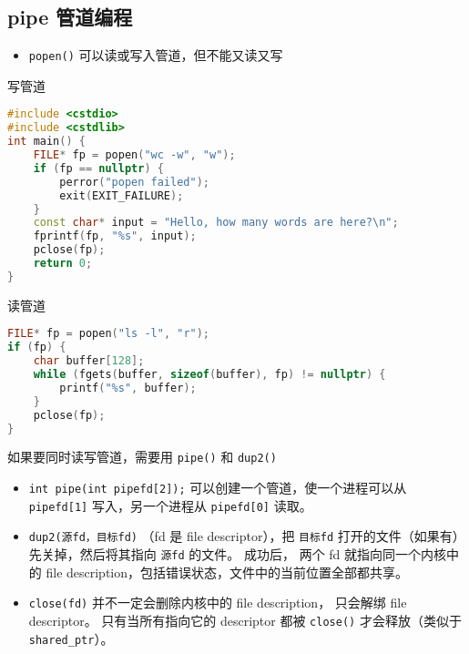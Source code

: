 \subsection{pipe 管道编程}
\begin{itemize}
\item \verb`popen()` 可以读或写入管道，但不能又读又写
\end{itemize}

写管道
\begin{lstlisting}[language=cpp]
#include <cstdio>
#include <cstdlib>
int main() {
    FILE* fp = popen("wc -w", "w");
    if (fp == nullptr) {
        perror("popen failed");
        exit(EXIT_FAILURE);
    }
    const char* input = "Hello, how many words are here?\n";
    fprintf(fp, "%s", input);
    pclose(fp);
    return 0;
}
\end{lstlisting}
读管道
\begin{lstlisting}[language=cpp]
FILE* fp = popen("ls -l", "r");
if (fp) {
    char buffer[128];
    while (fgets(buffer, sizeof(buffer), fp) != nullptr) {
        printf("%s", buffer);
    }
    pclose(fp);
}
\end{lstlisting}

如果要同时读写管道，需要用 \verb`pipe()` 和 \verb`dup2()`
\begin{itemize}
\item \verb`int pipe(int pipefd[2]);` 可以创建一个管道，使一个进程可以从 \verb`pipefd[1]` 写入，另一个进程从 \verb`pipefd[0]` 读取。
\item \verb`dup2(源fd，目标fd)` （fd 是 file descriptor），把 \verb`目标fd` 打开的文件（如果有）先关掉，然后将其指向 \verb`源fd` 的文件。 成功后， 两个 fd 就指向同一个内核中的 file description，包括错误状态，文件中的当前位置全部都共享。
\item \verb`close(fd)` 并不一定会删除内核中的 file description， 只会解绑 file descriptor。 只有当所有指向它的 descriptor 都被 \verb`close()` 才会释放（类似于 \verb`shared_ptr`）。
\end{itemize}

